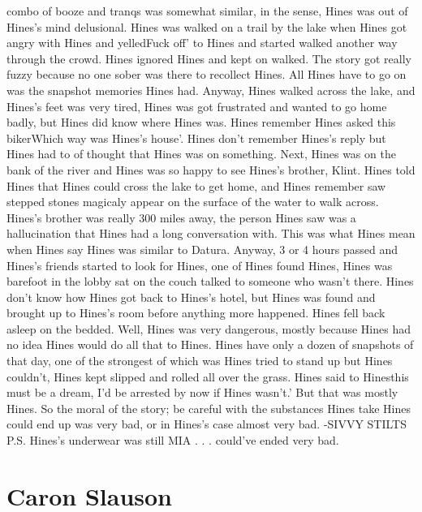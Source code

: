\documentclass[12pt]{book}
\begin{document}
combo of booze and tranqs was somewhat similar, in the sense, Hines was out of Hines's mind delusional. Hines was walked on a trail by the lake when Hines got angry with Hines and yelledFuck off' to Hines and started walked another way through the crowd. Hines ignored Hines and kept on walked. The story got really fuzzy because no one sober was there to recollect Hines. All Hines have to go on was the snapshot memories Hines had. Anyway, Hines walked across the lake, and Hines's feet was very tired, Hines was got frustrated and wanted to go home badly, but Hines did know where Hines was. Hines remember Hines asked this bikerWhich way was Hines's house'. Hines don't remember Hines's reply but Hines had to of thought that Hines was on something. Next, Hines was on the bank of the river and Hines was so happy to see Hines's brother, Klint. Hines told Hines that Hines could cross the lake to get home, and Hines remember saw stepped stones magicaly appear on the surface of the water to walk across. Hines's brother was really 300 miles away, the person Hines saw was a hallucination that Hines had a long conversation with. This was what Hines mean when Hines say Hines was similar to Datura. Anyway, 3 or 4 hours passed and Hines's friends started to look for Hines, one of Hines found Hines, Hines was barefoot in the lobby sat on the couch talked to someone who wasn't there. Hines don't know how Hines got back to Hines's hotel, but Hines was found and brought up to Hines's room before anything more happened. Hines fell back asleep on the bedded. Well, Hines was very dangerous, mostly because Hines had no idea Hines would do all that to Hines. Hines have only a dozen of snapshots of that day, one of the strongest of which was Hines tried to stand up but Hines couldn't, Hines kept slipped and rolled all over the grass. Hines said to Hinesthis must be a dream, I'd be arrested by now if Hines wasn't.' But that was mostly Hines. So the moral of the story; be careful with the substances Hines take Hines could end up was very bad, or in Hines's case almost very bad. -SIVVY STILTS P.S. Hines's underwear was still MIA . . .  could've ended very bad.



\chapter{Caron Slauson}
\end{document}
